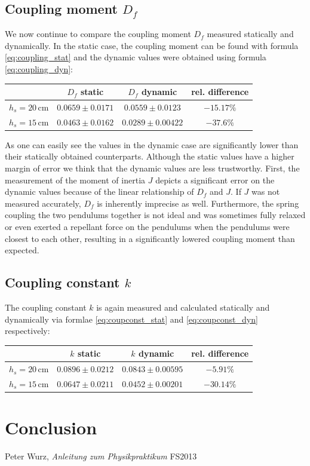 \documentclass{scrreprt}
\newcommand{\unit}[1]{\ensuremath{\, \mathrm{#1}}}
\begin{document}
\subsection{Coupling moment $D_f$}
We now continue to compare the coupling moment $D_f$ measured statically and dynamically. In the static case, the coupling moment can be found with formula \ref{eq:coupling_stat} and the dynamic values were obtained using formula \ref{eq:coupling_dyn}:

\begin{table}[H]
\center
\begin{tabular}{cccc}
 & $D_f$ static & $D_f$ dynamic & rel. difference\\
\hline
$h_s = 20 \unit{cm}$ & $0.0659 \pm 0.0171$ & $0.0559 \pm 0.0123$ & $-15.17\%$\\
$h_s = 15 \unit{cm}$ & $0.0463 \pm 0.0162$ & $0.0289 \pm 0.00422$ & $-37.6\%$\\
 
\end{tabular}
\end{table} 

As one can easily see the values in the dynamic case are significantly lower than their statically obtained counterparts. Although the static values have a higher margin of error we think that the dynamic values are less trustworthy. First, the measurement of the moment of inertia $J$ depicts a significant error on the dynamic values because of the linear relationship of $D_f$ and $J$. If $J$ was not measured accurately, $D_f$ is inherently imprecise as well. Furthermore, the spring coupling the two pendulums together is not ideal and was sometimes fully relaxed or even exerted a repellant force on the pendulums when the pendulums were closest to each other, resulting in a significantly lowered coupling moment than expected.

\subsection{Coupling constant $k$}
The coupling constant $k$ is again measured and calculated statically and dynamically via formlae \ref{eq:coupconst_stat} and \ref{eq:coupconst_dyn} respectively:

\begin{table}[H]
\center
\begin{tabular}{cccc}
 & $k$ static & $k$ dynamic & rel. difference\\
\hline
$h_s = 20 \unit{cm}$ & $0.0896 \pm 0.0212$ & $0.0843 \pm 0.00595$ & $-5.91\%$\\
$h_s = 15 \unit{cm}$ & $0.0647 \pm 0.0211$ & $0.0452 \pm 0.00201$ & $-30.14\%$\\
 
\end{tabular}
\end{table} 

\section{Conclusion}

\begin{thebibliography}{9}

  Peter Wurz,
  \emph{Anleitung zum Physikpraktikum}
  FS2013

\end{thebibliography}
\end{document}
